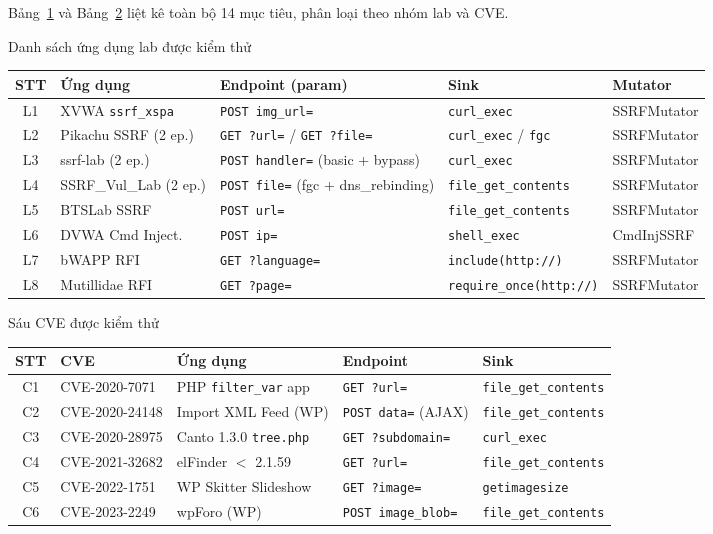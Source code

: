 Bảng~\ref{tab:lab-targets} và Bảng~\ref{tab:cve-targets} liệt kê toàn
bộ 14 mục tiêu, phân loại theo nhóm lab và CVE.

\begin{table}[h]{Danh sách ứng dụng lab được kiểm thử}
\label{tab:lab-targets}
\centering
\small
\begin{tabular}{|c|l|l|l|l|}
\hline
\textbf{STT} & \textbf{Ứng dụng} & \textbf{Endpoint (param)} & \textbf{Sink} & \textbf{Mutator} \\
\hline
L1 & XVWA \texttt{ssrf\_xspa}
   & \texttt{POST img\_url=}
   & \texttt{curl\_exec}
   & SSRFMutator \\
L2 & Pikachu SSRF (2 ep.)
   & \texttt{GET ?url=} / \texttt{GET ?file=}
   & \texttt{curl\_exec} / \texttt{fgc}
   & SSRFMutator \\
L3 & ssrf-lab (2 ep.)
   & \texttt{POST handler=} (basic + bypass)
   & \texttt{curl\_exec}
   & SSRFMutator \\
L4 & SSRF\_Vul\_Lab (2 ep.)
   & \texttt{POST file=} (fgc + dns\_rebinding)
   & \texttt{file\_get\_contents}
   & SSRFMutator \\
L5 & BTSLab SSRF
   & \texttt{POST url=}
   & \texttt{file\_get\_contents}
   & SSRFMutator \\
L6 & DVWA Cmd Inject.
   & \texttt{POST ip=}
   & \texttt{shell\_exec}
   & CmdInjSSRF \\
L7 & bWAPP RFI
   & \texttt{GET ?language=}
   & \texttt{include(http://)}
   & SSRFMutator \\
L8 & Mutillidae RFI
   & \texttt{GET ?page=}
   & \texttt{require\_once(http://)}
   & SSRFMutator \\
\hline
\end{tabular}
\end{table}

\begin{table}[h]{Sáu CVE được kiểm thử}
\label{tab:cve-targets}
\centering
\small
\begin{tabular}{|c|l|l|l|l|}
\hline
\textbf{STT} & \textbf{CVE} & \textbf{Ứng dụng} & \textbf{Endpoint} & \textbf{Sink} \\
\hline
C1 & CVE-2020-7071
   & PHP \texttt{filter\_var} app
   & \texttt{GET ?url=}
   & \texttt{file\_get\_contents} \\
C2 & CVE-2020-24148
   & Import XML Feed (WP)
   & \texttt{POST data=} (AJAX)
   & \texttt{file\_get\_contents} \\
C3 & CVE-2020-28975
   & Canto 1.3.0 \texttt{tree.php}
   & \texttt{GET ?subdomain=}
   & \texttt{curl\_exec} \\
C4 & CVE-2021-32682
   & elFinder $<$ 2.1.59
   & \texttt{GET ?url=}
   & \texttt{file\_get\_contents} \\
C5 & CVE-2022-1751
   & WP Skitter Slideshow
   & \texttt{GET ?image=}
   & \texttt{getimagesize} \\
C6 & CVE-2023-2249
   & wpForo (WP)
   & \texttt{POST image\_blob=}
   & \texttt{file\_get\_contents} \\
\hline
\end{tabular}
\end{table}

